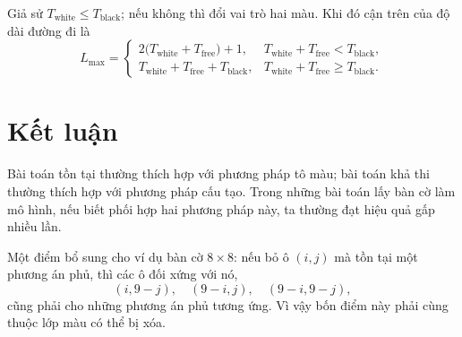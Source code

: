 \documentclass[11pt]{article}
\begin{document}
Giả sử \(T_{\text{white}}\le T_{\text{black}}\); nếu không thì đổi vai trò hai
màu. Khi đó cận trên của độ dài đường đi là
\[
L_{\max}=
\begin{cases}
  2\bigl(T_{\text{white}}+T_{\text{free}}\bigr)+1,
    & T_{\text{white}}+T_{\text{free}}<T_{\text{black}},\\
  T_{\text{white}}+T_{\text{free}}+T_{\text{black}},
    & T_{\text{white}}+T_{\text{free}}\ge T_{\text{black}}.
\end{cases}
\]

\section{Kết luận}

Bài toán tồn tại thường thích hợp với phương pháp tô màu; bài toán khả thi
thường thích hợp với phương pháp cấu tạo. Trong những bài toán lấy bàn cờ làm
mô hình, nếu biết phối hợp hai phương pháp này, ta thường đạt hiệu quả gấp
nhiều lần.

Một điểm bổ sung cho ví dụ bàn cờ \(8\times8\): nếu bỏ ô \((i,j)\) mà tồn tại
một phương án phủ, thì các ô đối xứng với nó,
\[
  (i,9-j),\quad (9-i,j),\quad (9-i,9-j),
\]
cũng phải cho những phương án phủ tương ứng. Vì vậy bốn điểm này phải cùng
thuộc lớp màu có thể bị xóa.
\end{document}
